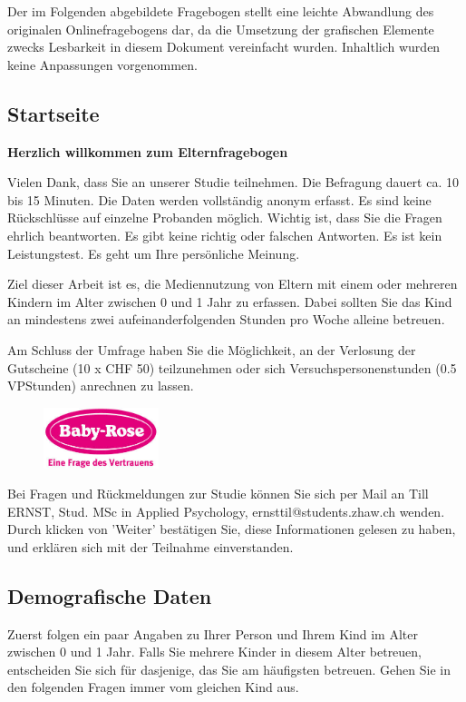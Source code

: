 Der im Folgenden abgebildete Fragebogen stellt eine leichte Abwandlung des originalen Onlinefragebogens dar, da die Umsetzung der grafischen Elemente zwecks Lesbarkeit in diesem Dokument vereinfacht wurden. Inhaltlich wurden keine Anpassungen vorgenommen.

\subsection{Startseite}
\textbf{Herzlich willkommen zum Elternfragebogen}

Vielen Dank, dass Sie an unserer Studie teilnehmen. Die Befragung dauert ca. 10 bis 15 Minuten. Die Daten werden vollständig anonym erfasst. Es sind keine Rückschlüsse auf einzelne Probanden möglich. Wichtig ist, dass Sie die Fragen ehrlich beantworten. Es gibt keine richtig oder falschen Antworten. Es ist kein Leistungstest. Es geht um Ihre persönliche Meinung.

Ziel dieser Arbeit ist es, die Mediennutzung von Eltern mit einem oder mehreren Kindern im Alter zwischen 0 und 1 Jahr zu erfassen. Dabei sollten Sie das Kind an mindestens zwei aufeinanderfolgenden Stunden pro Woche alleine betreuen.

Am Schluss der Umfrage haben Sie die Möglichkeit, an der Verlosung der Gutscheine (10 x CHF 50) teilzunehmen oder sich Versuchspersonenstunden (0.5 VPStunden) anrechnen zu lassen.

\begin{figure}[hbtp]
  \centering
     \includegraphics[width=0.3\textwidth]{content/Grafik/babyRose_Logo.jpg}
  \label{fig:babyRose_Logo}
\end{figure}

Bei Fragen und Rückmeldungen zur Studie können Sie sich per Mail an Till ERNST, Stud. MSc in Applied Psychology, ernsttil@students.zhaw.ch wenden. Durch klicken von 'Weiter' bestätigen Sie, diese Informationen gelesen zu haben, und erklären sich mit der Teilnahme einverstanden.

\subsection{Demografische Daten}
Zuerst folgen ein paar Angaben zu Ihrer Person und Ihrem Kind im Alter zwischen 0 und 1 Jahr. Falls Sie mehrere Kinder in diesem Alter betreuen, entscheiden Sie sich für dasjenige, das Sie am häufigsten betreuen. Gehen Sie in den folgenden Fragen immer vom gleichen Kind aus.

